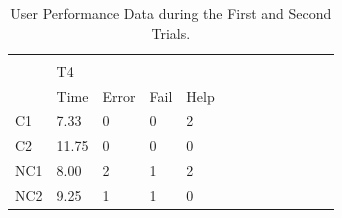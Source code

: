 \begin{table}[ht]
\begin{tabular}{lllllllllllll}
                              &                            &                            &                           &                           &                            &                            &                           &                           &                           &                            &                           &                           \\ \cline{2-5}
    \multicolumn{1}{l|}{}     & \multicolumn{4}{l|}{T4}                                                                                         &                            &                            &                           &                           &                           &                            &                           &                           \\ \cline{2-5}
    \multicolumn{1}{l|}{}     & \multicolumn{1}{l|}{Time}  & \multicolumn{1}{l|}{Error} & \multicolumn{1}{l|}{Fail} & \multicolumn{1}{l|}{Help} &                            &                            &                           &                           &                           &                            &                           &                           \\ \cline{1-5}
    \multicolumn{1}{|l|}{C1}  & \multicolumn{1}{l|}{7.33}  & \multicolumn{1}{l|}{0}     & \multicolumn{1}{l|}{0}    & \multicolumn{1}{l|}{2}    &                            &                            &                           &                           &                           &                            &                           &                           \\ \cline{1-5}
    \multicolumn{1}{|l|}{C2}  & \multicolumn{1}{l|}{11.75} & \multicolumn{1}{l|}{0}     & \multicolumn{1}{l|}{0}    & \multicolumn{1}{l|}{0}    &                            &                            &                           &                           &                           &                            &                           &                           \\ \cline{1-5}
    \multicolumn{1}{|l|}{NC1} & \multicolumn{1}{l|}{8.00}  & \multicolumn{1}{l|}{2}     & \multicolumn{1}{l|}{1}    & \multicolumn{1}{l|}{2}    &                            &                            &                           &                           &                           &                            &                           &                           \\ \cline{1-5}
    \multicolumn{1}{|l|}{NC2} & \multicolumn{1}{l|}{9.25}  & \multicolumn{1}{l|}{1}     & \multicolumn{1}{l|}{1}    & \multicolumn{1}{l|}{0}    &                            &                            &                           &                           &                           &                            &                           &                           \\ \cline{1-5}
    \end{tabular}
    \caption{\label{tab:Table_Performance}User Performance Data during the First and Second Trials.}
    \end{table}
